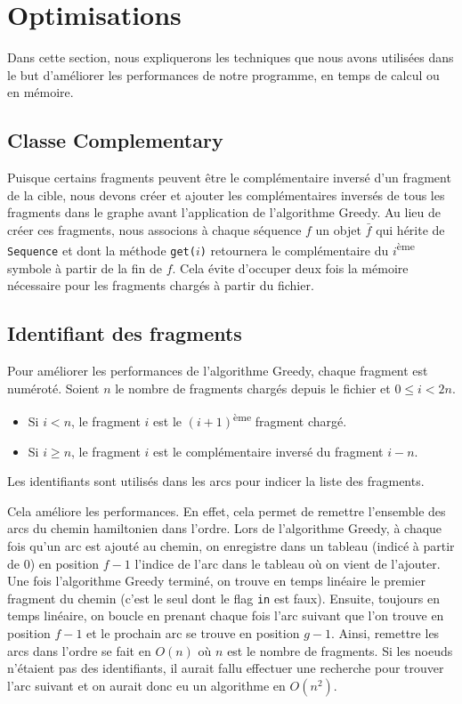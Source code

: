\section{Optimisations}
Dans cette section, nous expliquerons les techniques que nous avons utilisées dans le but d'améliorer les performances de notre programme, en temps de calcul ou en mémoire.

\subsection{Classe Complementary}
Puisque certains fragments peuvent être le complémentaire inversé d'un fragment
de la cible, nous devons créer et ajouter les complémentaires inversés de
tous les fragments dans le graphe avant l'application de l'algorithme Greedy.
Au lieu de créer ces fragments, nous associons à chaque séquence $f$ un objet
$\bar{f}$ qui hérite de \texttt{Sequence} et dont la méthode \texttt{get($i$)}
retournera le complémentaire du $i$\textsuperscript{ème} symbole
à partir de la fin de $f$.
Cela évite d'occuper deux fois la mémoire nécessaire
pour les fragments chargés à partir du fichier.

\subsection{Identifiant des fragments}\label{sec:id}
Pour améliorer les performances de l'algorithme Greedy, chaque fragment est
numéroté. Soient $n$ le nombre de fragments chargés depuis le fichier et $0 \le i < 2n$.
\begin{itemize}
 \item Si $i < n$, le fragment $i$ est le $(i+1)$\textsuperscript{ème} fragment chargé.
 \item Si $i \ge n$, le fragment $i$ est le complémentaire inversé du fragment $i-n$.
\end{itemize}

Les identifiants sont utilisés dans les arcs pour indicer la liste des fragments.

Cela améliore les performances. En effet, cela permet de remettre l'ensemble
des arcs du chemin hamiltonien dans l'ordre.
Lors de l'algorithme Greedy, à chaque fois qu'un arc  est ajouté
au chemin, on enregistre dans un tableau (indicé à partir de 0)
en position $f-1$ l'indice de l'arc dans le tableau où on vient de l'ajouter.
Une fois l'algorithme Greedy terminé, on trouve en temps linéaire
le premier fragment du chemin (c'est le seul dont le flag \texttt{in} est faux).
Ensuite, toujours en temps linéaire, on boucle en prenant chaque fois
l'arc  suivant que l'on trouve en position $f-1$ et
le prochain arc se trouve en position $g-1$.
Ainsi, remettre les arcs dans l'ordre se fait en $O(n)$
où $n$ est le nombre de fragments.
Si les noeuds n'étaient pas des identifiants, il aurait fallu effectuer
une recherche pour trouver l'arc suivant et
on aurait donc eu un algorithme en $O\left(n^2\right)$.

